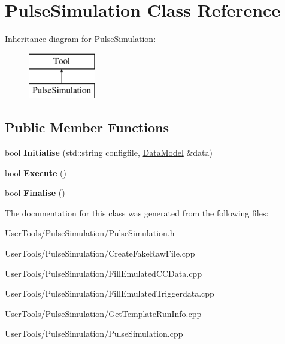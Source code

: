 \hypertarget{classPulseSimulation}{\section{Pulse\-Simulation Class Reference}
\label{classPulseSimulation}
}
Inheritance diagram for Pulse\-Simulation\-:\begin{figure}[H]
\begin{center}
\leavevmode
\includegraphics[height=2.000000cm]{classPulseSimulation}
\end{center}
\end{figure}
\subsection*{Public Member Functions}
\begin{DoxyCompactItemize}
\item 
\hypertarget{classPulseSimulation_a58b5d01a88aa646f8f89ec60372fdfec}{bool {\bfseries Initialise} (std\-::string configfile, \hyperlink{classDataModel}{Data\-Model} \&data)}\label{classPulseSimulation_a58b5d01a88aa646f8f89ec60372fdfec}

\item 
\hypertarget{classPulseSimulation_ae65d207c87254a420c4b25172354bef7}{bool {\bfseries Execute} ()}\label{classPulseSimulation_ae65d207c87254a420c4b25172354bef7}

\item 
\hypertarget{classPulseSimulation_a8a798184a88f99597de1266fe34fed10}{bool {\bfseries Finalise} ()}\label{classPulseSimulation_a8a798184a88f99597de1266fe34fed10}

\end{DoxyCompactItemize}


The documentation for this class was generated from the following files\-:\begin{DoxyCompactItemize}
\item 
User\-Tools/\-Pulse\-Simulation/Pulse\-Simulation.\-h\item 
User\-Tools/\-Pulse\-Simulation/Create\-Fake\-Raw\-File.\-cpp\item 
User\-Tools/\-Pulse\-Simulation/Fill\-Emulated\-C\-C\-Data.\-cpp\item 
User\-Tools/\-Pulse\-Simulation/Fill\-Emulated\-Triggerdata.\-cpp\item 
User\-Tools/\-Pulse\-Simulation/Get\-Template\-Run\-Info.\-cpp\item 
User\-Tools/\-Pulse\-Simulation/Pulse\-Simulation.\-cpp\end{DoxyCompactItemize}
